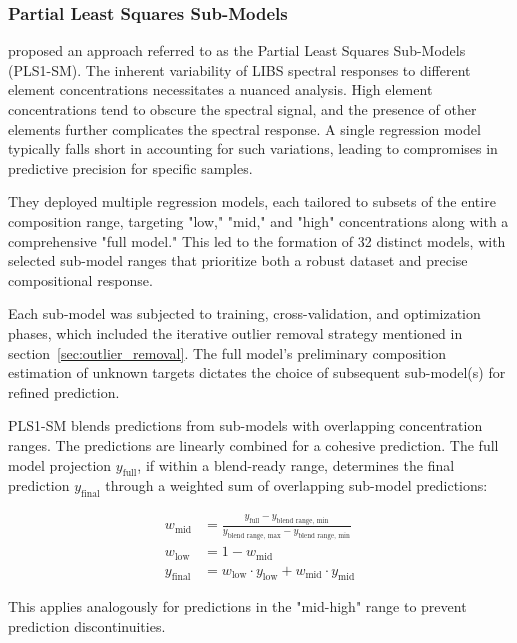 \subsubsection{Partial Least Squares Sub-Models}\label{sec:pls_submodels}

\citet{andersonImprovedAccuracyQuantitative2017} proposed an approach referred to as the Partial Least Squares Sub-Models (PLS1-SM).
The inherent variability of LIBS spectral responses to different element concentrations necessitates a nuanced analysis. High element concentrations tend to obscure the spectral signal, and the presence of other elements further complicates the spectral response. A single regression model typically falls short in accounting for such variations, leading to compromises in predictive precision for specific samples.

They deployed multiple regression models, each tailored to subsets of the entire composition range, targeting "low," "mid," and "high" concentrations along with a comprehensive "full model." This led to the formation of 32 distinct models, with selected sub-model ranges that prioritize both a robust dataset and precise compositional response.

Each sub-model was subjected to training, cross-validation, and optimization phases, which included the iterative outlier removal strategy mentioned in section~\ref{sec:outlier_removal}. The full model's preliminary composition estimation of unknown targets dictates the choice of subsequent sub-model(s) for refined prediction.

PLS1-SM blends predictions from sub-models with overlapping concentration ranges. The predictions are linearly combined for a cohesive prediction. The full model projection $y_{\text{full}}$, if within a blend-ready range, determines the final prediction $y_{\text{final}}$ through a weighted sum of overlapping sub-model predictions:

\begin{align*}
w_{\text{mid}} &= \frac{y_{\text{full}}-y_{\text{blend range, min}}}{y_{\text{blend range, max}} - y_{\text{blend range, min}}} \\
w_{\text{low}} &= 1 - w_{\text{mid}} \\
y_{\text{final}} &= w_{\text{low}}\cdot y_{\text{low}} + w_{\text{mid}}\cdot y_{\text{mid}} 
\end{align*}

This applies analogously for predictions in the "mid-high" range to prevent prediction discontinuities.

